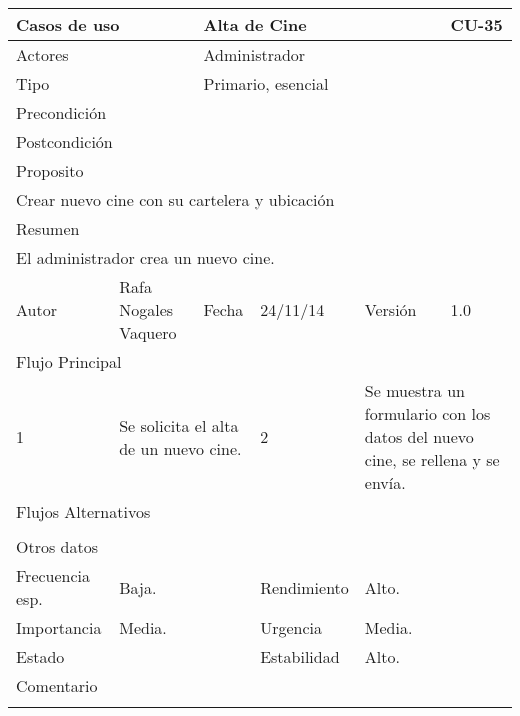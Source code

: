 \documentclass{article}
\begin{document}
\begin{table}[h]
\begin{tabular}{|l|l|l|l|l|l|}
\hline
\multicolumn{2}{|p{2cm}|}{Casos de uso}  & \multicolumn{3}{p{7cm}|}{Alta de Cine} & CU-35 \\
\hline
\multicolumn{2}{|p{2cm}|}{Actores}       & \multicolumn{4}{p{8cm}|}{Administrador}        \\
\hline
\multicolumn{2}{|p{2cm}|}{Tipo}          & \multicolumn{4}{p{8cm}|}{Primario, esencial}        \\
\hline
\multicolumn{2}{|p{2cm}|}{Precondición}  & \multicolumn{4}{p{8cm}|}{}        \\
\hline
\multicolumn{2}{|p{2cm}|}{Postcondición} & \multicolumn{4}{p{8cm}|}{}        \\
\hline
\multicolumn{6}{|p{10cm}|}{Proposito}                                   \\
\hline
\multicolumn{6}{|p{10cm}|}{Crear nuevo cine con su cartelera y ubicación}                                            \\
\hline
\multicolumn{6}{|p{10cm}|}{Resumen}                                 \\
\hline
\multicolumn{6}{|p{10cm}|}{El administrador crea un nuevo cine.}                                            \\
\hline
Autor         &       Rafa Nogales Vaquero        &  Fecha   &  24/11/14   &   Versión  & 1.0\\
\hline
\multicolumn{6}{|p{10cm}|}{Flujo Principal}\\
\hline
\multicolumn{1}{|p{1cm}|}{1} & \multicolumn{2}{p{3cm}}{Se solicita el alta de un nuevo cine.} & \multicolumn{1}{|p{1cm}|}{2} & \multicolumn{2}{p{3cm}|}{Se muestra un formulario con los datos del nuevo cine, se rellena y se envía.}\\
\hline
\multicolumn{6}{|p{10cm}|}{Flujos Alternativos}\\
\hline
\multicolumn{1}{|p{1cm}}{} & \multicolumn{5}{|p{9cm}|}{}\\
\hline
\multicolumn{6}{|p{10cm}|}{Otros datos}\\
\hline
\multicolumn{1}{|p{2cm}|}{Frecuencia esp.} & \multicolumn{2}{p{3cm}}{Baja.} & \multicolumn{1}{|p{2cm}|}{Rendimiento} & \multicolumn{2}{p{3cm}|}{Alto.}\\
\hline
\multicolumn{1}{|p{2cm}|}{Importancia} & \multicolumn{2}{p{3cm}}{Media.} & \multicolumn{1}{|p{2cm}|}{Urgencia} & \multicolumn{2}{p{3cm}|}{Media.}\\
\hline
\multicolumn{1}{|p{2cm}|}{Estado} & \multicolumn{2}{p{3cm}}{} & \multicolumn{1}{|p{2cm}|}{Estabilidad} & \multicolumn{2}{p{3cm}|}{Alto.}\\
\hline
\multicolumn{6}{|p{10cm}|}{Comentario}\\
\hline
\multicolumn{6}{|p{10cm}|}{}\\
\hline
\end{tabular}
\end{table}
\end{document}
